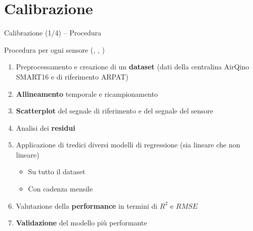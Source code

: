 \section{Calibrazione}

\begin{frame}{Calibrazione (1/4) – Procedura}

\begin{block}{Procedura per ogni sensore (, , )}
\begin{enumerate}
  \item Preprocessamento e creazione di un \textbf{dataset} (dati della centralina AirQino SMART16 e di riferimento ARPAT)
  \item \textbf{Allineamento} temporale e ricampionamento
  \item \textbf{Scatterplot} del segnale di riferimento e del segnale del sensore
  \item Analisi dei \textbf{residui}
  \item Applicazione di tredici diversi modelli di \alert{regressione} (sia lineare che non lineare)
  \begin{itemize}
    \item Su tutto il dataset
    \item Con cadenza mensile
  \end{itemize}
  \item Valutazione della \textbf{performance} in termini di $R^2$ e $RMSE$
  \item \textbf{Validazione} del modello più performante\vspace{0.1cm}
\end{enumerate}
\end{block}

\end{frame}

